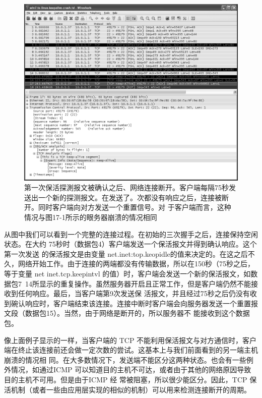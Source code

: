 \begin{figure}[!htb]
    \centering
	\includegraphics[width=1\textwidth]{imgs/17/17-2.png}
	\caption{第一次保活探測报文被确认之后、网络连接断开。客户端每隔75秒发送出一个新的探测报文。在发送了。次都没有响应之后，连接被断开。同时客户端向对方发送一个重置信号。对
    于客户端而言，这种情况与图17-1所示的眼务器崩溃的情况相同}
\end{figure}

从图中我们可以看到一个完整的连接过程。在初始的三次握手之后，连接保持空闲状态。在大约 75秒时（数据包4）客户端发送一个保活报文并得到确认响应。这个第一次发送
的保活报文是由变量 net.inet:top.keopidle的值来决定的。在这之后不久，网络开始工作。由于连接的两端都没有传输数据，所以在150秒（75秒之后，等于变量 net inet.tcp.keepintvl
的值）时，客户端会发送一个新的保活报文，如数据包7~14所显示的重复操作。虽然服务器开启且正常工作，但是客户端仍然不能接收到任何响应。最后，当客户端第9次发送保
活报文，并且经过75秒之后仍没有收到碗认响应时，客户端结束该连接。连接中断时客户端会向服务器发送一个重置报文段（数据包15）。当然，由于网络是断开的，所以服务器不
能接收到这个数据包。

像上面例子显示的一样，当客户端的 TCP 不能利用保活报文与对方通信时，客户端在终止该连接前还会做一定次数的尝试。这基本上与我们前面看到的另一端主机崩溃的情况相
同。在大多数情况下，发送端不能区分这两种状态。也会有一些例外情况，如通过ICMP 可以知道目的主机不可达，或者由于其他的网络原因导致目的主机不可用。但是由于ICMP 经
常被阻塞，所以很少能区分。因此，TCP 保活机制（或者一些由应用层实现的相似的机制）可以用来检测连接断开的周期。

